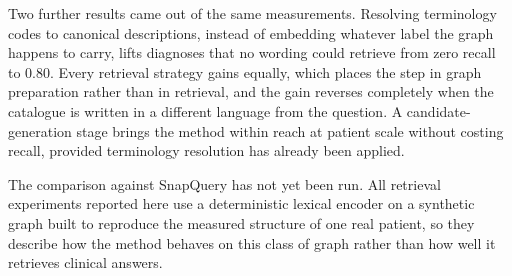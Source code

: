 Two further results came out of the same measurements. Resolving terminology
codes to canonical descriptions, instead of embedding whatever label the graph
happens to carry, lifts diagnoses that no wording could retrieve from zero recall
to 0.80. Every retrieval strategy gains equally, which places the step in graph
preparation rather than in retrieval, and the gain reverses completely when the
catalogue is written in a different language from the question. A
candidate-generation stage brings the method within reach at patient scale
without costing recall, provided terminology resolution has already been applied.

The comparison against SnapQuery has not yet been run. All retrieval experiments
reported here use a deterministic lexical encoder on a synthetic graph built to
reproduce the measured structure of one real patient, so they describe how the
method behaves on this class of graph rather than how well it retrieves clinical
answers.
